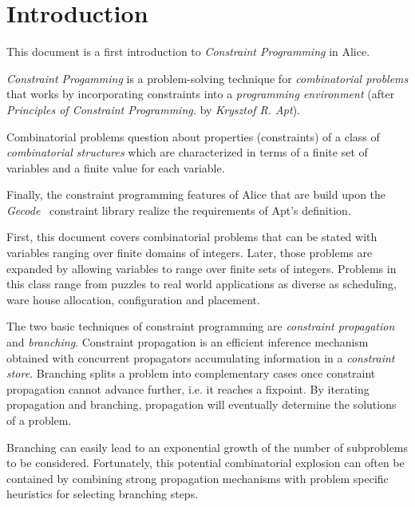 \documentclass[a4paper,halfparskip]{scrartcl}
\begin{document}
\newpage

\tableofcontents

\listoffigures

\lstlistoflistings

\newpage

\section{Introduction}
This document is a first introduction to \emph{Constraint Programming}
in Alice.

\emph{Constraint Progamming} is a problem-solving technique for
\emph{combinatorial problems} that works by incorporating constraints
into a \emph{programming environment} (after \cite{3} \emph{Principles
  of Constraint Programming.} by \emph{Krysztof R. Apt}).

Combinatorial problems question about properties (constraints) of a
class of \emph{combinatorial structures} which are characterized in
terms of a finite set of variables and a finite value for each
variable.

Finally, the constraint programming features of Alice that are build
upon the \emph{Gecode}~\cite{12} constraint library realize the
requirements of Apt's definition.

First, this document covers combinatorial problems that can be
stated with variables ranging over finite domains of
integers. Later, those problems are expanded by allowing variables to
range over finite sets of integers.
Problems in this class range from puzzles to real world applications as 
diverse as scheduling, ware house allocation, configuration and placement.

The two basic techniques of constraint programming are
\emph{constraint propagation} and \emph{branching}. Constraint
propagation is an efficient inference mechanism obtained with
concurrent propagators accumulating information in a \emph{constraint
  store}.  Branching splits a problem into complementary cases once
constraint propagation cannot advance further, i.e. it reaches a
fixpoint.  By iterating propagation and branching, propagation will
eventually determine the solutions of a problem.

Branching can easily lead to an exponential growth of the number of
subproblems to be considered. Fortunately, this potential
combinatorial explosion can often be contained by combining strong
propagation mechanisms with problem specific heuristics for selecting
branching steps.
\end{document}
